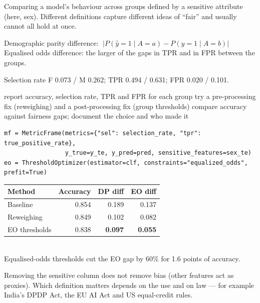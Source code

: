 \documentclass[11pt,a4paper]{article}
\begin{document}
\begin{bdef}
Comparing a model's behaviour across groups defined by a sensitive attribute (here, sex). Different definitions capture different ideas of ``fair'' and usually cannot all hold at once.
\end{bdef}
\begin{bmath}
Demographic parity difference: $\;|P(\hat y=1\mid A=a)-P(\hat y=1\mid A=b)|$\\[2pt]
Equalised odds difference: the larger of the gaps in TPR and in FPR between the groups.
\end{bmath}
\begin{bres}
Selection rate F 0.073 / M 0.262; TPR 0.494 / 0.631; FPR 0.020 / 0.101.
\end{bres}
\begin{balgo}
\begin{algorithmic}[1]
\State report accuracy, selection rate, TPR and FPR for each group
\State try a pre-processing fix (reweighing) and a post-processing fix (group thresholds)
\State compare accuracy against fairness gaps; document the choice and who made it
\end{algorithmic}
\end{balgo}
\begin{bcode}
\begin{lstlisting}
mf = MetricFrame(metrics={"sel": selection_rate, "tpr": true_positive_rate},
                 y_true=y_te, y_pred=pred, sensitive_features=sex_te)
eo = ThresholdOptimizer(estimator=clf, constraints="equalized_odds", prefit=True)
\end{lstlisting}
\end{bcode}
\begin{bres}
\begin{tabular}{lrrr}
\toprule
Method & Accuracy & DP diff & EO diff\\
\midrule
Baseline & 0.854 & 0.189 & 0.137\\
Reweighing & 0.849 & 0.102 & 0.082\\
EO thresholds & 0.838 & \textbf{0.097} & \textbf{0.055}\\
\bottomrule
\end{tabular}\\[3pt]
Equalised-odds thresholds cut the EO gap by 60\% for 1.6 points of accuracy.
\end{bres}
\begin{bwarn}
Removing the sensitive column does not remove bias (other features act as proxies). Which definition matters depends on the use and on law --- for example India's DPDP Act, the EU AI Act and US equal-credit rules.
\end{bwarn}
\end{document}
